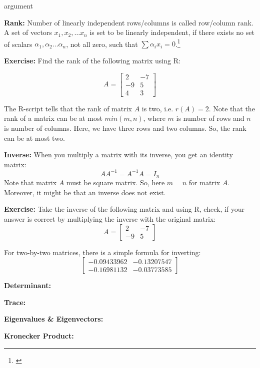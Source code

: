 \begin{labeling}{argument}
    \item[\textbf{Rank:}] Number of linearly independent rows/columns is called row/column rank. A set of vectors $x_1, x_2, \ldots x_n$ is set to be linearly independent, if there exists no set of scalars $\alpha_1, \alpha_2 \ldots \alpha_n$, not all zero, such that $\sum \alpha_i x_i = 0$.\footnote{\cite[][see page 8]{MagnusNeudecker-2019-part1}}

    \textbf{Exercise:} Find the rank of the following matrix using R:

    \[
        A = \begin{bmatrix}
            2  & -7 \\
            -9 & 5  \\
            4  & 3
        \end{bmatrix}
    \]

    \begin{sol}
        

        The R-script tells that the rank of matrix $A$ is two, i.e. $r(A) = 2$. Note that the rank of a matrix can be at most $min(m, n)$, where $m$ is number of rows and $n$ is number of columns. Here, we have three rows and two columns. So, the rank can be at most two.
    \end{sol}

    \item[\textbf{Inverse:}] When you multiply a matrix with its inverse, you get an identity matrix:
    \[
        A A^{-1} = A^{-1} A = I_n
    \]
    Note that matrix $A$ must be square matrix. So, here $m = n$ for matrix $A$. Moreover, it might be that an inverse does not exist.

    \textbf{Exercise:} Take the inverse of the following matrix and using R, check, if your answer is correct by multiplying the inverse with the original matrix:
    \[
        A = \begin{bmatrix}
            2  & -7 \\
            -9 & 5
        \end{bmatrix}
    \]

    \begin{sol}
        For two-by-two matrices, there is a simple formula for inverting:
        \[
            \begin{bmatrix}
                -0.09433962 & -0.13207547 \\
                -0.16981132 & -0.03773585
            \end{bmatrix}
        \]
    \end{sol}

    \item[\textbf{Determinant:}]

    \item[\textbf{Trace:}]

    \item[\textbf{Eigenvalues \& Eigenvectors:}]

    \item[\textbf{Kronecker Product:}]
\end{labeling}